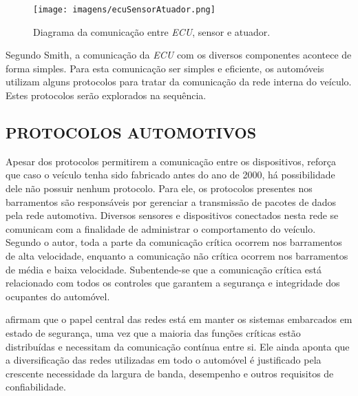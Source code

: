 \begin{figure}[!ht]
\centering
\caption{Diagrama da comunicação entre \textit{ECU}, sensor e atuador.} 
{\texttt{[image: imagens/ecuSensorAtuador.png]}}\\
 \label{Fig:relacao_ecu_sensor_atuador}
\end{figure}

Segundo Smith, a comunicação da \textit{ECU} com os diversos componentes acontece de forma simples. Para esta comunicação ser simples e eficiente, os automóveis utilizam alguns protocolos para tratar da comunicação da rede interna do veículo. Estes protocolos serão explorados na sequência.

\subsection{PROTOCOLOS AUTOMOTIVOS}
Apesar dos protocolos permitirem a comunicação entre os dispositivos,  reforça que caso o veículo tenha sido fabricado antes do ano de 2000, há possibilidade dele não possuir nenhum protocolo. Para ele, os protocolos presentes nos barramentos são responsáveis por gerenciar a transmissão de pacotes de dados pela rede automotiva. Diversos sensores e dispositivos conectados nesta rede se comunicam com a finalidade de administrar o comportamento do veículo. Segundo o autor, toda a parte da comunicação crítica ocorrem nos barramentos de alta velocidade, enquanto a comunicação não crítica ocorrem nos barramentos de média e baixa velocidade. Subentende-se que a comunicação crítica está relacionado com todos os controles que garantem a segurança e integridade dos ocupantes do automóvel. 

 afirmam que o papel central das redes está em manter os sistemas embarcados em estado de segurança, uma vez que a maioria das funções críticas estão distribuídas e necessitam da comunicação contínua entre si. Ele ainda aponta que a diversificação das redes utilizadas em todo o automóvel é justificado pela crescente necessidade da largura de banda, desempenho e outros requisitos de confiabilidade.

